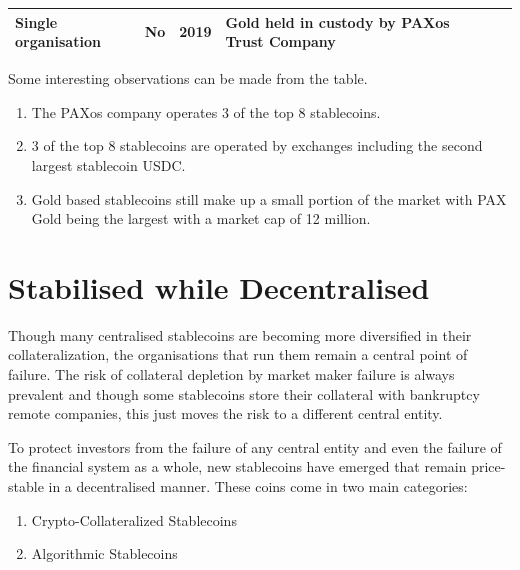 \documentclass[english,]{IEEEtran}
\providecommand{\tightlist}{%
  \setlength{\itemsep}{0pt}\setlength{\parskip}{0pt}}
\begin{document}
\begin{longtable}[]{@{}lllllll@{}}
\begin{minipage}[t]{0.10\columnwidth}
Single organisation\strut
\end{minipage} & \begin{minipage}[t]{0.08\columnwidth}\raggedright\strut
No\strut
\end{minipage} & \begin{minipage}[t]{0.04\columnwidth}\raggedright\strut
2019\strut
\end{minipage} & \begin{minipage}[t]{0.30\columnwidth}\raggedright\strut
Gold held in custody by PAXos Trust Company\strut
\end{minipage}\tabularnewline
\bottomrule
\end{longtable}

Some interesting observations can be made from the table.

\begin{enumerate}
\def\labelenumi{\arabic{enumi}.}
\tightlist
\item
  The PAXos company operates 3 of the top 8 stablecoins.
\item
  3 of the top 8 stablecoins are operated by exchanges including the
  second largest stablecoin USDC.
\item
  Gold based stablecoins still make up a small portion of the market
  with PAX Gold being the largest with a market cap of 12 million.
\end{enumerate}

\section{Stabilised while
Decentralised}\label{stabilised-while-decentralised}

Though many centralised stablecoins are becoming more diversified in
their collateralization, the organisations that run them remain a
central point of failure. The risk of collateral depletion by market
maker failure is always prevalent and though some stablecoins store
their collateral with bankruptcy remote companies, this just moves the
risk to a different central entity.

To protect investors from the failure of any central entity and even the
failure of the financial system as a whole, new stablecoins have emerged
that remain price-stable in a decentralised manner. These coins come in
two main categories:

\begin{enumerate}
\def\labelenumi{\arabic{enumi}.}
\tightlist
\item
  Crypto-Collateralized Stablecoins
\item
  Algorithmic Stablecoins
\end{enumerate}
\end{document}
